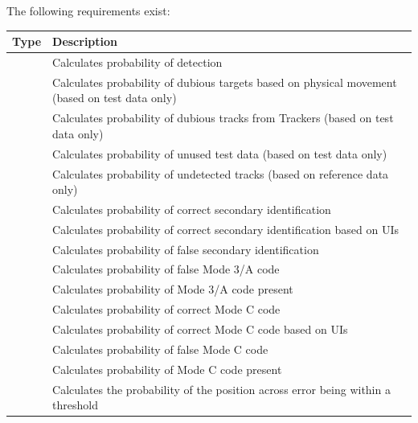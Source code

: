 The following requirements exist:

\begin{center}
 \begin{table}[H]
  \begin{tabularx}{\textwidth}{ | l | X |  }
    \hline
    \textbf{Type} & \textbf{Description} \\ \hline
    \nameref{sec:eval_req_detection} & Calculates probability of detection  \\ \hline
    \nameref{sec:eval_req_dubious_targets} & Calculates probability of dubious targets based on physical movement (based on test data only) \\ \hline
    \nameref{sec:eval_req_dubious_tracks} & Calculates probability of dubious tracks from Trackers (based on test data only) \\ \hline
    \nameref{sec:eval_req_extra_data} & Calculates probability of unused test data (based on test data only) \\ \hline
    \nameref{sec:eval_req_extra_track} & Calculates probability of undetected tracks (based on reference data only) \\ \hline
    \nameref{sec:eval_req_id_correct} & Calculates probability of correct secondary identification \\ \hline
    \nameref{sec:eval_req_id_correct_periods} & Calculates probability of correct secondary identification based on UIs \\ \hline
    \nameref{sec:eval_req_id_false} & Calculates probability of false secondary identification \\ \hline
    \nameref{sec:eval_req_m3a_false} & Calculates probability of false Mode 3/A code \\ \hline
    \nameref{sec:eval_req_m3a_present} & Calculates probability of Mode 3/A code present \\ \hline
    \nameref{sec:eval_req_mc_correct} & Calculates probability of correct Mode C code \\ \hline
    \nameref{sec:eval_req_mc_correct_periods} & Calculates probability of correct Mode C code based on UIs \\ \hline
    \nameref{sec:eval_req_mc_false} & Calculates probability of false Mode C code \\ \hline
    \nameref{sec:eval_req_mc_present} & Calculates probability of Mode C code present \\ \hline
    \nameref{sec:eval_req_pos_across} & Calculates the probability of the position across error being within a threshold \\ \hline

\end{tabularx}
\end{table}
\end{center}
